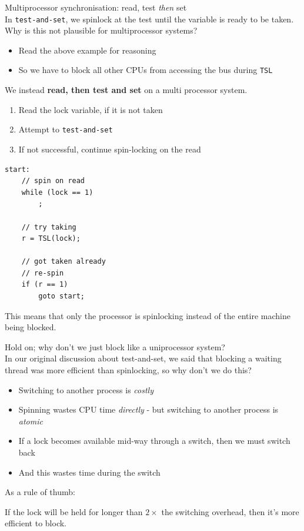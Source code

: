 \documentclass[journal, letterpaper]{IEEEtran}
\begin{document}
\begin{theory}{Multiprocessor synchronisation: read, test \textit{then} set} \\
    In \verb|test-and-set|, we spinlock at the test until the variable is ready to be taken. Why is this not plausible for multiprocessor systems?
    \begin{itemize}
        \item Read the above example for reasoning
        \item So we have to block all other CPUs from accessing the bus during \verb|TSL|
    \end{itemize}
    We instead \textbf{read, then test and set} on a multi processor system.
    \begin{enumerate}
        \item Read the lock variable, if it is not taken
        \item Attempt to \verb|test-and-set|
        \item If not successful, continue spin-locking on the read
    \end{enumerate}
    \begin{verbatim}
start:
    // spin on read
    while (lock == 1)
        ;
    
    // try taking
    r = TSL(lock);
    
    // got taken already
    // re-spin
    if (r == 1)
        goto start;\end{verbatim}
    This means that only the processor is spinlocking instead of the entire machine being blocked.
\end{theory}
\begin{aside}{Hold on; why don't we just block like a uniprocessor system?} \\
    In our original discussion about test-and-set, we said that blocking a waiting thread was more efficient than spinlocking, so why don't we do this?
    \begin{itemize}
        \item Switching to another process is \textit{costly}
        \item Spinning wastes CPU time \textit{directly} - but switching to another process is \textit{atomic}
        \item If a lock becomes available mid-way through a switch, then we must switch back 
        \item And this wastes time during the switch
    \end{itemize}
    As a rule of thumb:
    \begin{center}
        If the lock will be held for longer than $2\times$ the switching overhead, then it's more efficient to block.
    \end{center}
\end{aside}
\end{document}
